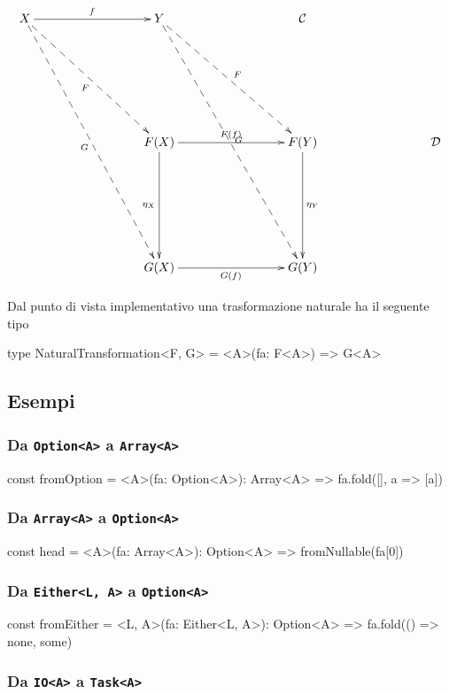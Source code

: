 \documentclass[12pt]{article}
\theoremstyle{definition}
\newenvironment{code}
  {\vspace{0.5cm} \VerbatimEnvironment\begin{typescriptcode}}
  {\end{typescriptcode} \vspace{0.2cm}}
\begin{document}
\[
\xymatrixrowsep{3cm}
\xymatrixcolsep{3cm}
\xymatrix{
  X \ar@{-->}[rd]_{F} \ar@{-->}[rdd]_{G} \ar[r]^{f} & Y \ar@{-->}[rd]^{F} \ar@{-->}[rdd]^{G} & \mathcal{C} \\
  & F(X) \ar[r]^{F(f)} \ar[d]_{\eta_X} & F(Y) \ar[d]^{\eta_Y} & \mathcal{D} \\
  & G(X) \ar[r]_{G(f)} & G(Y) \\
}
\]

Dal punto di vista implementativo una trasformazione naturale ha il seguente tipo

\begin{code}
type NaturalTransformation<F, G> = <A>(fa: F<A>) => G<A>
\end{code}

\subsection{Esempi}

\subsubsection{Da \texttt{Option<A>} a \texttt{Array<A>}}

\begin{code}
const fromOption = <A>(fa: Option<A>): Array<A> =>
  fa.fold([], a => [a])
\end{code}

\subsubsection{Da \texttt{Array<A>} a \texttt{Option<A>}}

\begin{code}
const head = <A>(fa: Array<A>): Option<A> =>
  fromNullable(fa[0])
\end{code}

\subsubsection{Da \texttt{Either<L, A>} a \texttt{Option<A>}}

\begin{code}
const fromEither = <L, A>(fa: Either<L, A>): Option<A> =>
  fa.fold(() => none, some)
\end{code}

\subsubsection{Da \texttt{IO<A>} a \texttt{Task<A>}}
\end{document}
